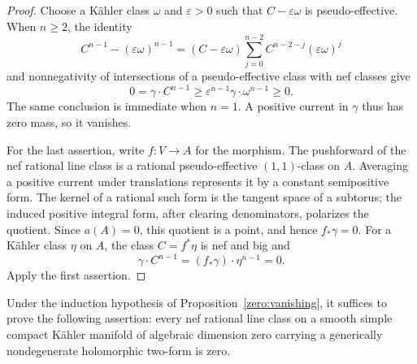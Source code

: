 \begin{proof}
Choose a Kähler class \(\omega\) and \(\varepsilon>0\) such that
\(C-\varepsilon\omega\) is pseudo-effective.  When \(n\ge2\), the
identity
\[
 C^{n-1}-(\varepsilon\omega)^{n-1}
 =(C-\varepsilon\omega)
   \sum_{j=0}^{n-2}C^{n-2-j}(\varepsilon\omega)^j
\]
and nonnegativity of intersections of a pseudo-effective class with
nef classes give
\[
 0=\gamma\cdot C^{n-1}
 \ge \varepsilon^{n-1}\gamma\cdot\omega^{n-1}\ge0.
\]
The same conclusion is immediate when \(n=1\).  A positive current in
\(\gamma\) thus has zero mass, so it vanishes.

For the last assertion, write \(f:V\to A\) for the morphism.  The
pushforward of the nef rational line class is a rational
pseudo-effective \((1,1)\)-class on \(A\).  Averaging a positive current
under translations represents it by a constant semipositive form.  The
kernel of a rational such form is the tangent space of a subtorus; the
induced positive integral form, after clearing denominators, polarizes
the quotient.  Since \(a(A)=0\), this quotient is a point, and hence
\(f_*\gamma=0\).  For a Kähler class \(\eta\) on \(A\), the class
\(C=f^*\eta\) is nef and big and
\[
 \gamma\cdot C^{n-1}=(f_*\gamma)\cdot\eta^{n-1}=0.
\]
Apply the first assertion.
\end{proof}

\begin{lemma}\label{zero:geometric-reduction}
Under the induction hypothesis of Proposition~\ref{zero:vanishing},
it suffices to prove the following assertion: every nef rational line
class on a smooth simple compact Kähler manifold of algebraic dimension
zero carrying a generically nondegenerate holomorphic two-form is zero.
\end{lemma}

